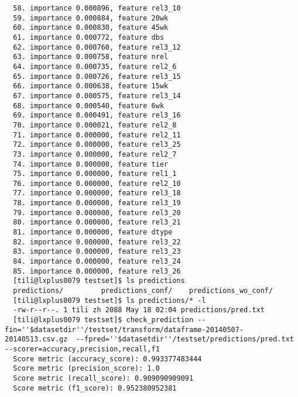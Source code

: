 \begin{verbatim}
  58. importance 0.000896, feature rel3_10
  59. importance 0.000884, feature 20wk
  60. importance 0.000830, feature 45wk
  61. importance 0.000772, feature dbs
  62. importance 0.000760, feature rel3_12
  63. importance 0.000758, feature nrel
  64. importance 0.000735, feature rel2_6
  65. importance 0.000726, feature rel3_15
  66. importance 0.000638, feature 15wk
  67. importance 0.000575, feature rel3_14
  68. importance 0.000540, feature 6wk
  69. importance 0.000491, feature rel3_16
  70. importance 0.000021, feature rel2_8
  71. importance 0.000000, feature rel2_11
  72. importance 0.000000, feature rel3_25
  73. importance 0.000000, feature rel2_7
  74. importance 0.000000, feature tier
  75. importance 0.000000, feature rel1_1
  76. importance 0.000000, feature rel2_10
  77. importance 0.000000, feature rel3_18
  78. importance 0.000000, feature rel3_19
  79. importance 0.000000, feature rel3_20
  80. importance 0.000000, feature rel3_21
  81. importance 0.000000, feature dtype
  82. importance 0.000000, feature rel3_22
  83. importance 0.000000, feature rel3_23
  84. importance 0.000000, feature rel3_24
  85. importance 0.000000, feature rel3_26
  [tili@lxplus0079 testset]$ ls predictions
  predictions/         predictions_conf/    predictions_wo_conf/
  [tili@lxplus0079 testset]$ ls predictions/* -l
  -rw-r--r--. 1 tili zh 2088 May 18 02:04 predictions/pred.txt
  [tili@lxplus0079 testset]$ check_prediction --fin=''$datasetdir''/testset/transform/dataframe-20140507-20140513.csv.gz  --fpred=''$datasetdir''/testset/predictions/pred.txt  --scorer=accuracy,precision,recall,f1
  Score metric (accuracy_score): 0.993377483444
  Score metric (precision_score): 1.0
  Score metric (recall_score): 0.909090909091
  Score metric (f1_score): 0.952380952381
\end{verbatim}
